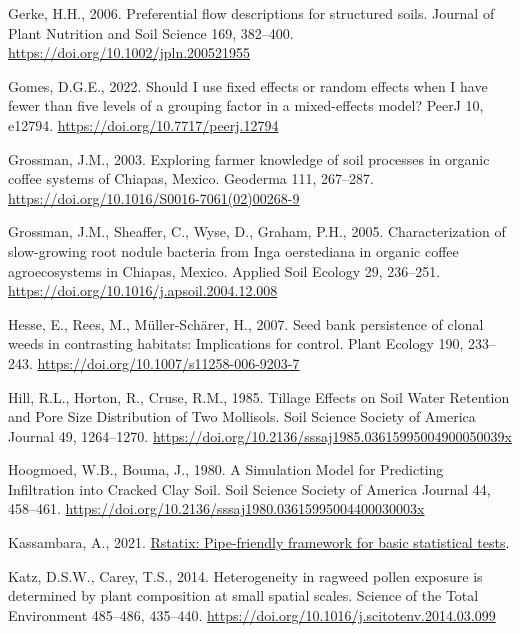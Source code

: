 \documentclass[
  12pt,
]{article}
\newlength{\cslhangindent}
\newlength{\cslentryspacingunit} %
\newenvironment{CSLReferences}[2] %
 {%
  \setlength{\parindent}{0pt}
  \ifodd #1
  \let\oldpar\par
  \def\par{\hangindent=\cslhangindent\oldpar}
  \fi
  \setlength{\parskip}{#2\cslentryspacingunit}
 }%
 {}
\begin{document}
\begin{CSLReferences}{1}{0}
\leavevmode{}%
Gerke, H.H., 2006. Preferential flow descriptions for structured soils. Journal of Plant Nutrition and Soil Science 169, 382--400. \url{https://doi.org/10.1002/jpln.200521955}

\leavevmode{}%
Gomes, D.G.E., 2022. Should {I} use fixed effects or random effects when {I} have fewer than five levels of a grouping factor in a mixed-effects model? PeerJ 10, e12794. \url{https://doi.org/10.7717/peerj.12794}

\leavevmode{}%
Grossman, J.M., 2003. Exploring farmer knowledge of soil processes in organic coffee systems of {Chiapas}, {Mexico}. Geoderma 111, 267--287. \url{https://doi.org/10.1016/S0016-7061(02)00268-9}

\leavevmode{}%
Grossman, J.M., Sheaffer, C., Wyse, D., Graham, P.H., 2005. Characterization of slow-growing root nodule bacteria from {Inga} oerstediana in organic coffee agroecosystems in {Chiapas}, {Mexico}. Applied Soil Ecology 29, 236--251. \url{https://doi.org/10.1016/j.apsoil.2004.12.008}

\leavevmode{}%
Hesse, E., Rees, M., Müller-Schärer, H., 2007. Seed bank persistence of clonal weeds in contrasting habitats: Implications for control. Plant Ecology 190, 233--243. \url{https://doi.org/10.1007/s11258-006-9203-7}

\leavevmode{}%
Hill, R.L., Horton, R., Cruse, R.M., 1985. Tillage {Effects} on {Soil Water Retention} and {Pore Size Distribution} of {Two Mollisols}. Soil Science Society of America Journal 49, 1264--1270. \url{https://doi.org/10.2136/sssaj1985.03615995004900050039x}

\leavevmode{}%
Hoogmoed, W.B., Bouma, J., 1980. A {Simulation Model} for {Predicting Infiltration} into {Cracked Clay Soil}. Soil Science Society of America Journal 44, 458--461. \url{https://doi.org/10.2136/sssaj1980.03615995004400030003x}

\leavevmode{}%
Kassambara, A., 2021. \href{https://CRAN.R-project.org/package=rstatix}{Rstatix: Pipe-friendly framework for basic statistical tests}.

\leavevmode{}%
Katz, D.S.W., Carey, T.S., 2014. Heterogeneity in ragweed pollen exposure is determined by plant composition at small spatial scales. Science of the Total Environment 485--486, 435--440. \url{https://doi.org/10.1016/j.scitotenv.2014.03.099}


\end{CSLReferences}
\end{document}
